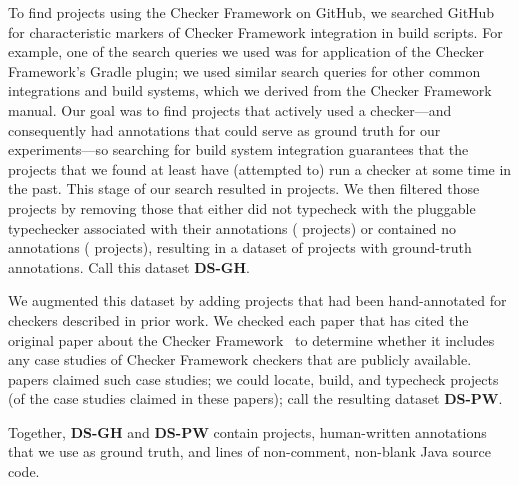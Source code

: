 To find projects using the Checker Framework on GitHub, we searched GitHub for characteristic
markers of Checker Framework integration in build scripts. For example, one of the search
queries we used was for application of the Checker Framework's Gradle plugin; we used similar
search queries for other common integrations and build systems, which we derived from
the Checker Framework manual.
Our goal was to find projects that actively used a checker---and
consequently had annotations that could serve as ground truth for our experiments---so
searching for build system integration guarantees that the projects that we found at least
have (attempted to) run a checker at some time in the past. This stage of our search
resulted in  projects. We then filtered those projects by removing those that
either did not typecheck with the pluggable typechecker associated with their annotations (
projects) or contained no annotations ( projects),
resulting in a dataset of  projects with ground-truth annotations.
Call this dataset \textbf{DS-GH}.

We augmented this dataset by adding projects that had been hand-annotated for checkers
described in prior work. We checked each paper that has cited the original paper
about the Checker Framework~\cite{PapiACPE2008} to determine whether it includes any
case studies of Checker Framework checkers that are publicly available.  papers
claimed such case studies; we could locate, build, and typecheck  projects (of
the  case studies claimed in these papers); call the resulting dataset \textbf{DS-PW}.

Together, \textbf{DS-GH} and \textbf{DS-PW} contain  projects,  human-written
annotations that we use as ground truth, and  lines of non-comment, non-blank Java
source code.

